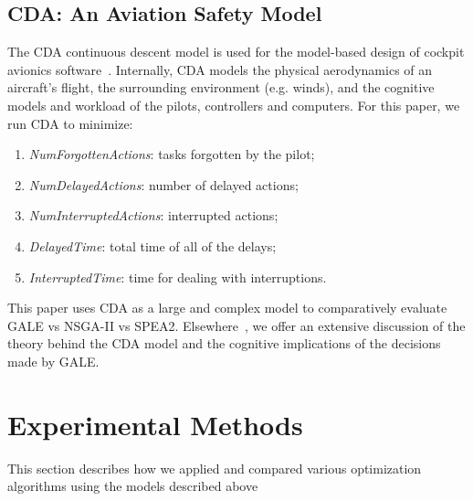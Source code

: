 \documentclass[10pt,journal,compsoc]{IEEEtran}
\newcommand{\bi}{\begin{itemize}}
\newcommand{\ei}{\end{itemize}}
\newcommand{\be}{\begin{enumerate}}
\newcommand{\ee}{\end{enumerate}}
\begin{document}


\subsection{CDA: An Aviation Safety Model}\label{sec:cda}

The CDA continuous descent model is used for the model-based design of cockpit avionics software~\cite{Kim2011,Pritchett2011,Feigh2012,Kim2013,Pritchett2013}.
Internally, CDA models the physical aerodynamics of an aircraft's flight, the surrounding environment (e.g. winds), and the cognitive models and workload of the pilots, controllers and computers.
For this paper, we run CDA to  minimize:
\be
\item
\emph{NumForgottenActions}:
tasks forgotten by the pilot;
\item
{\em NumDelayedActions}: number of delayed actions;
\item
 \emph{NumInterruptedActions}: 
interrupted actions;
\item 
\emph{DelayedTime}:
total time of all of the delays;
\item 
{\em InterruptedTime}: time for
dealing with interruptions.
\ee
This paper   uses CDA as a large and complex model
to comparatively evaluate  GALE vs NSGA-II vs SPEA2.
Elsewhere~\cite{krall15:hms}, we offer an extensive discussion of the theory behind the CDA model
and the cognitive implications of the decisions made by GALE. 




\section{Experimental Methods}

This section describes how we applied and compared various optimization algorithms using the models described above
\end{document}
